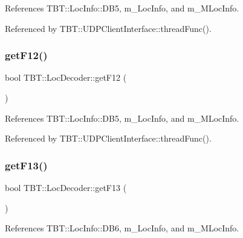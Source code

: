 References T\+B\+T\+::\+Loc\+Info\+::\+D\+B5, m\+\_\+\+Loc\+Info, and m\+\_\+\+M\+Loc\+Info.



Referenced by T\+B\+T\+::\+U\+D\+P\+Client\+Interface\+::thread\+Func().

\mbox{\label{classTBT_1_1LocDecoder_aa9ff3866964a5a6be01d6a6c22498b9d_aa9ff3866964a5a6be01d6a6c22498b9d}} 
\subsubsection{\texorpdfstring{get\+F12()}{getF12()}}
{\footnotesize\ttfamily bool T\+B\+T\+::\+Loc\+Decoder\+::get\+F12 (\begin{DoxyParamCaption}{ }\end{DoxyParamCaption})\hspace{0.3cm}{\ttfamily [inline]}}



References T\+B\+T\+::\+Loc\+Info\+::\+D\+B5, m\+\_\+\+Loc\+Info, and m\+\_\+\+M\+Loc\+Info.



Referenced by T\+B\+T\+::\+U\+D\+P\+Client\+Interface\+::thread\+Func().

\mbox{\label{classTBT_1_1LocDecoder_aeca11289c531630bcecf39fd747d97b4_aeca11289c531630bcecf39fd747d97b4}} 
\subsubsection{\texorpdfstring{get\+F13()}{getF13()}}
{\footnotesize\ttfamily bool T\+B\+T\+::\+Loc\+Decoder\+::get\+F13 (\begin{DoxyParamCaption}{ }\end{DoxyParamCaption})\hspace{0.3cm}{\ttfamily [inline]}}



References T\+B\+T\+::\+Loc\+Info\+::\+D\+B6, m\+\_\+\+Loc\+Info, and m\+\_\+\+M\+Loc\+Info.



